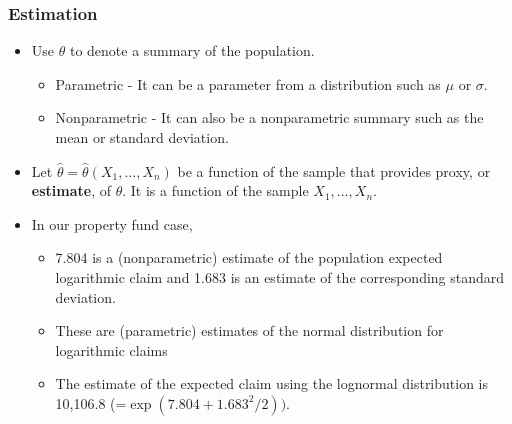 \documentclass{beamer}
\begin{document}
\begin{frame}[shrink=2]
\frametitle{Estimation}
\begin{itemize}
\item Use $\theta$ to denote a summary of the population.
\begin{itemize}
\item Parametric - It can be a parameter from a distribution such as $\mu$ or $\sigma$.
\item Nonparametric - It can also be a nonparametric summary such as the mean or standard deviation.
\end{itemize}
\item Let $\hat{\theta} =\hat{\theta}(X_1, \ldots, X_n)$ be a function of the sample that provides proxy, or \textbf{estimate}, of $\theta$. It is a function of the sample $X_1, \ldots, X_n$.
\item In our property fund case,
\begin{itemize}
\item 7.804 is a (nonparametric) estimate of the population expected logarithmic claim and 1.683 is an estimate of the corresponding standard deviation.
\item These are (parametric) estimates of the normal distribution for logarithmic claims
\item The estimate of the expected claim using the lognormal distribution is 10,106.8 (=$\exp(7.804+1.683^2/2))$.
\end{itemize}
\end{itemize}
\end{frame}
\end{document}

